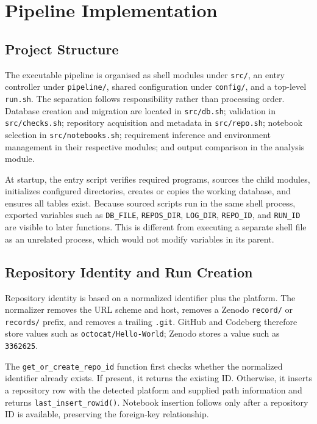 \chapter{Pipeline Implementation}
\label{chap:implementation}

\section{Project Structure}

The executable pipeline is organised as shell modules under \texttt{src/}, an entry controller under \texttt{pipeline/}, shared configuration under \texttt{config/}, and a top-level \texttt{run.sh}. The separation follows responsibility rather than processing order. Database creation and migration are located in \texttt{src/db.sh}; validation in \texttt{src/checks.sh}; repository acquisition and metadata in \texttt{src/repo.sh}; notebook selection in \texttt{src/notebooks.sh}; requirement inference and environment management in their respective modules; and output comparison in the analysis module.

At startup, the entry script verifies required programs, sources the child modules, initializes configured directories, creates or copies the working database, and ensures all tables exist. Because sourced scripts run in the same shell process, exported variables such as \texttt{DB\_FILE}, \texttt{REPOS\_DIR}, \texttt{LOG\_DIR}, \texttt{REPO\_ID}, and \texttt{RUN\_ID} are visible to later functions. This is different from executing a separate shell file as an unrelated process, which would not modify variables in its parent.

\section{Repository Identity and Run Creation}

Repository identity is based on a normalized identifier plus the platform. The normalizer removes the URL scheme and host, removes a Zenodo \texttt{record/} or \texttt{records/} prefix, and removes a trailing \texttt{.git}. GitHub and Codeberg therefore store values such as \texttt{octocat/Hello-World}; Zenodo stores a value such as \texttt{3362625}.

The \texttt{get\_or\_create\_repo\_id} function first checks whether the normalized identifier already exists. If present, it returns the existing ID. Otherwise, it inserts a repository row with the detected platform and supplied path information and returns \texttt{last\_insert\_rowid()}. Notebook insertion follows only after a repository ID is available, preserving the foreign-key relationship.

